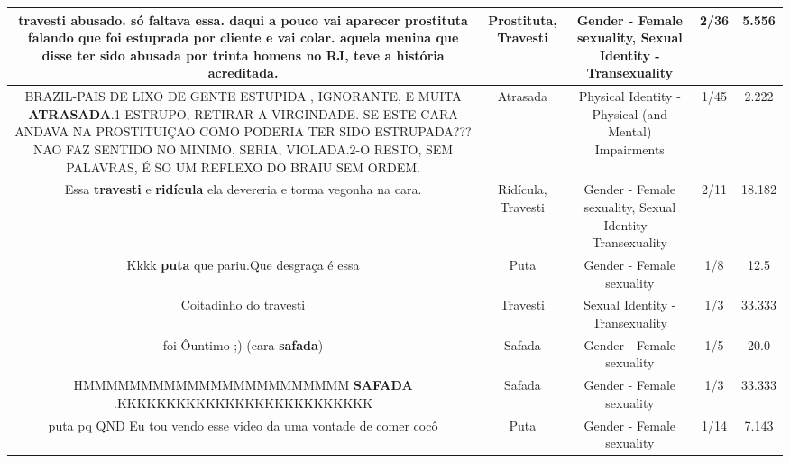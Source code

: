 \documentclass[11pt]{article}
\newlength\mylength
\begin{document}
\begin{center}
\begin{longtable}{|C{.65\mylength}|C{.30\mylength}|C{.12\mylength}|C{.12\mylength}|C{.12\mylength}|}
  \small travesti abusado. só faltava essa. daqui a pouco vai aparecer \textbf{prostituta} falando que foi estuprada por cliente e vai colar. aquela menina que disse ter sido abusada por trinta homens  no RJ, teve a história acreditada.\normalsize   & Prostituta, Travesti & Gender - Female sexuality, Sexual Identity - Transexuality & 2/36 & 5.556 \\  \hline
  \small BRAZIL-PAIS DE LIXO DE GENTE ESTUPIDA , IGNORANTE, E MUITA \textbf{ATRASADA}.1-ESTRUPO, RETIRAR A VIRGINDADE. SE ESTE CARA ANDAVA NA PROSTITUIÇAO COMO PODERIA TER SIDO ESTRUPADA??? NAO FAZ SENTIDO NO MINIMO, SERIA, VIOLADA.2-O RESTO, SEM PALAVRAS, É SO UM REFLEXO DO BRAIU SEM ORDEM.\normalsize   & Atrasada & Physical Identity - Physical (and Mental) Impairments & 1/45 & 2.222 \\  \hline
  \small Essa \textbf{travesti} e \textbf{ridícula} ela devereria e torma vegonha na cara.\normalsize   & Ridícula, Travesti & Gender - Female sexuality, Sexual Identity - Transexuality & 2/11 & 18.182 \\  \hline
  \small Kkkk \textbf{puta} que pariu.Que desgraça é essa\normalsize   & Puta & Gender - Female sexuality & 1/8 & 12.5 \\  \hline
  \small Coitadinho do travesti\normalsize   & Travesti & Sexual Identity - Transexuality & 1/3 & 33.333 \\  \hline
  \small foi Ôuntimo ;) (cara \textbf{safada})\normalsize   & Safada & Gender - Female sexuality & 1/5 & 20.0 \\  \hline
  \small HMMMMMMMMMMMMMMMMMMMMMMM \textbf{SAFADA} .KKKKKKKKKKKKKKKKKKKKKKKKKK\normalsize   & Safada & Gender - Female sexuality & 1/3 & 33.333 \\  \hline
  \small puta pq QND Eu tou vendo esse video da uma vontade de comer cocô\normalsize   & Puta & Gender - Female sexuality & 1/14 & 7.143 \\  \hline

\end{longtable}
\end{center}
\end{document}
